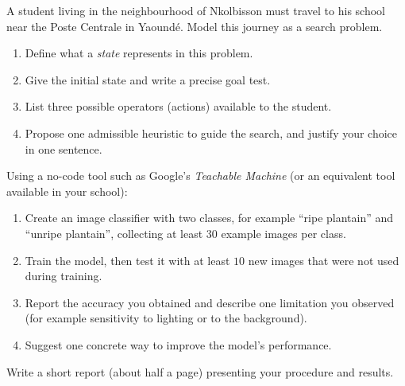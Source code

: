 \documentclass[11pt]{article}
\newcommand{\cle}[1]{{\popxbold\color{popdark}#1}}
\newcounter{popsec}
\newcounter{popsub}
\newcommand{\courssub}[1]{%
  \stepcounter{popsub}%
  \par\vspace{9pt}\noindent{\popxbold\fontsize{11.5}{13}\selectfont\color{popink}{\color{poporange}\thepopsec.\thepopsub}\hspace{6pt}#1}\par\nopagebreak\vspace{4pt}
}
\begin{document}
\begin{exercice}
A student living in the neighbourhood of Nkolbisson must travel to his school near the Poste Centrale in Yaoundé. Model this journey as a \cle{search problem}.
\begin{enumerate}
\item Define what a \emph{state} represents in this problem.
\item Give the initial state and write a precise goal test.
\item List three possible operators (actions) available to the student.
\item Propose one admissible heuristic to guide the search, and justify your choice in one sentence.
\end{enumerate}
\end{exercice}

\begin{exercice}
Using a no-code tool such as Google's \emph{Teachable Machine} (or an equivalent tool available in your school):
\begin{enumerate}
\item Create an image classifier with two classes, for example ``ripe plantain'' and ``unripe plantain'', collecting at least $30$ example images per class.
\item Train the model, then test it with at least $10$ new images that were not used during training.
\item Report the accuracy you obtained and describe one limitation you observed (for example sensitivity to lighting or to the background).
\item Suggest one concrete way to improve the model's performance.
\end{enumerate}
Write a short report (about half a page) presenting your procedure and results.
\end{exercice}

\courssub{I prepare for the GCE}
\end{document}
